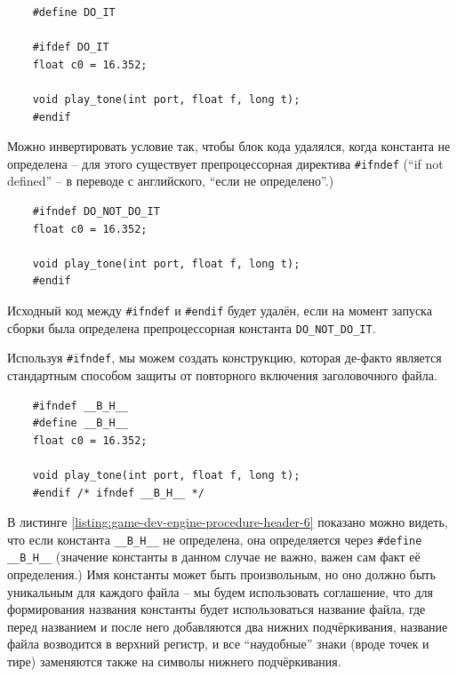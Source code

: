 \documentclass[../sparc.tex]{subfiles}
\begin{document}
\begin{listing}[H]
  \begin{verbatim}
    #define DO_IT

    #ifdef DO_IT
    float c0 = 16.352;

    void play_tone(int port, float f, long t);
    #endif
  \end{verbatim}
  \label{listing:game-dev-engine-procedure-header-4-2}
  \caption{Пример использования препроцессорной константы без значения.}
\end{listing}

Можно инвертировать условие так, чтобы блок кода удалялся, когда константа не
определена -- для этого существует препроцессорная директива
\texttt{#ifndef} (``if not defined'' -- в переводе с английского, ``если
не определено''.)

\begin{listing}[H]
  \begin{verbatim}
    #ifndef DO_NOT_DO_IT
    float c0 = 16.352;

    void play_tone(int port, float f, long t);
    #endif
  \end{verbatim}
  \label{listing:game-dev-engine-procedure-header-5}
  \caption{Пример использования препроцессорного условия с логической
    инверсией.}
\end{listing}

Исходный код между \texttt{#ifndef} и \texttt{#endif} будет
удалён, если на момент запуска сборки была определена препроцессорная константа
\texttt{DO_NOT_DO_IT}.

Используя \texttt{#ifndef}, мы можем создать конструкцию, которая
де-факто является стандартным способом защиты от повторного включения
заголовочного файла.

\begin{listing}[H]
  \begin{verbatim}
    #ifndef __B_H__
    #define __B_H__
    float c0 = 16.352;

    void play_tone(int port, float f, long t);
    #endif /* ifndef __B_H__ */
  \end{verbatim}
  \label{listing:game-dev-engine-procedure-header-6}
  \caption{Пример использования препроцессорного условия для защиты от
    повторного включения файла ``b.h''.}
\end{listing}

В листинге \ref{listing:game-dev-engine-procedure-header-6} показано можно
видеть, что если константа \texttt{__B_H__} не определена, она
определяется через \texttt{#define __B_H__} (значение константы в
данном случае не важно, важен сам факт её определения.)  Имя константы может
быть произвольным, но оно должно быть уникальным для каждого файла -- мы будем
использовать соглашение, что для формирования названия константы будет
использоваться название файла, где перед названием и после него добавляются два
нижних подчёркивания, название файла возводится в верхний регистр, и все
``наудобные'' знаки (вроде точек и тире) заменяются также на символы нижнего
подчёркивания.
\end{document}
